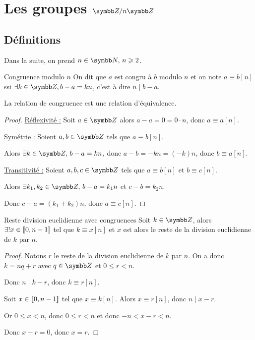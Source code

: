 \section{Les groupes \texorpdfstring{$\Z / n \Z$}{Z/nZ}}
\subsection{Définitions}

Dans la suite, on prend $n \in \N, \, n \geqslant 2$.

\begin{definition}{Congruence modulo $n$}{}
    On dit que $a$ est congru à $b$ modulo $n$ et on note $a \equiv b [n]$ ssi
    $\exists k \in \Z, b - a = kn$, c'est à dire $n \mid b - a$.    
\end{definition}

\begin{proposition}{}{}
    La relation de congruence est une relation d'équivalence.
\end{proposition}

\begin{proof}
    \uline{Réflexivité :}
    Soit $a \in \Z$ alors $a - a = 0 = 0 \cdot n$, donc $a \equiv a [n]$.

    \svspace \uline{Symétrie :}
    Soient $a, b \in \Z$ tels que $a \equiv b [n]$.

    Alors $\exists k \in \Z, \, b - a = kn$, donc $a - b = -kn = (-k)n$, donc $b \equiv a [n]$.

    \svspace \uline{Transitivité :} Soient $a, b, c \in \Z$ tels que $a \equiv b [n]$ et $b \equiv c [n]$.

    Alors $\exists k_1, k_2 \in \Z, \, b - a = k_1 n$ et $c - b = k_2 n$.

    Donc $c - a = (k_1 + k_2)n$, donc $a \equiv c [n]$.
\end{proof}

\begin{proposition}{Reste division euclidienne avec congruences}{}
    Soit $k \in \Z$, alors $\exists ! x \in [\![0, n-1]\!]$ tel que $k \equiv x [n]$ 
    et $x$ est alors le reste de la division euclidienne de $k$ par $n$.
\end{proposition}


\begin{proof}
    Notons $r$ le reste de la division euclidienne de $k$ par $n$. 
    On a donc $k = nq + r$ avec $q \in \Z$ et $0 \leqslant r < n$.
    
    Donc $n \mid k - r$, donc $k \equiv r [n]$.

    \avspace Soit $x \in [\![0, n-1]\!]$ tel que $x \equiv k [n]$.
    Alors $x \equiv r [n]$, donc $n \mid x - r$.

    Or $0 \leqslant x < n$, donc $0 \leqslant r < n$
    et donc $-n < x - r < n$.

    Donc $x - r = 0$, donc $x = r$.
\end{proof}

